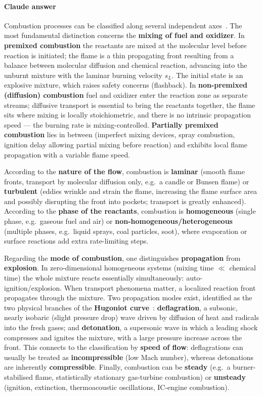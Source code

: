 {\color{istblue}
\paragraph{Claude answer}
Combustion processes can be classified along several independent axes~\cite{lecture4,warnatz2006combustion}. The most fundamental distinction concerns the \textbf{mixing of fuel and oxidizer}. In \textbf{premixed combustion} the reactants are mixed at the molecular level before reaction is initiated; the flame is a thin propagating front resulting from a balance between molecular diffusion and chemical reaction, advancing into the unburnt mixture with the laminar burning velocity $s_L$. The initial state is an explosive mixture, which raises safety concerns (flashback). In \textbf{non-premixed (diffusion) combustion} fuel and oxidizer enter the reaction zone as separate streams; diffusive transport is essential to bring the reactants together, the flame sits where mixing is locally stoichiometric, and there is no intrinsic propagation speed --- the burning rate is mixing-controlled. \textbf{Partially premixed combustion} lies in between (imperfect mixing devices, spray combustion, ignition delay allowing partial mixing before reaction) and exhibits local flame propagation with a variable flame speed.

According to the \textbf{nature of the flow}, combustion is \textbf{laminar} (smooth flame fronts, transport by molecular diffusion only, e.g.\ a candle or Bunsen flame) or \textbf{turbulent} (eddies wrinkle and strain the flame, increasing the flame surface area and possibly disrupting the front into pockets; transport is greatly enhanced). According to the \textbf{phase of the reactants}, combustion is \textbf{homogeneous} (single phase, e.g.\ gaseous fuel and air) or \textbf{non-homogeneous/heterogeneous} (multiple phases, e.g.\ liquid sprays, coal particles, soot), where evaporation or surface reactions add extra rate-limiting steps.

Regarding the \textbf{mode of combustion}, one distinguishes \textbf{propagation} from \textbf{explosion}. In zero-dimensional homogeneous systems (mixing time $\ll$ chemical time) the whole mixture reacts essentially simultaneously: auto-ignition/explosion. When transport phenomena matter, a localized reaction front propagates through the mixture. Two propagation modes exist, identified as the two physical branches of the \textbf{Hugoniot curve}~\cite{lecture4,glassman2014combustion}: \textbf{deflagration}, a subsonic, nearly isobaric (slight pressure drop) wave driven by diffusion of heat and radicals into the fresh gases; and \textbf{detonation}, a supersonic wave in which a leading shock compresses and ignites the mixture, with a large pressure increase across the front. This connects to the classification by \textbf{speed of flow}: deflagrations can usually be treated as \textbf{incompressible} (low Mach number), whereas detonations are inherently \textbf{compressible}. Finally, combustion can be \textbf{steady} (e.g.\ a burner-stabilised flame, statistically stationary gas-turbine combustion) or \textbf{unsteady} (ignition, extinction, thermoacoustic oscillations, IC-engine combustion).

}
